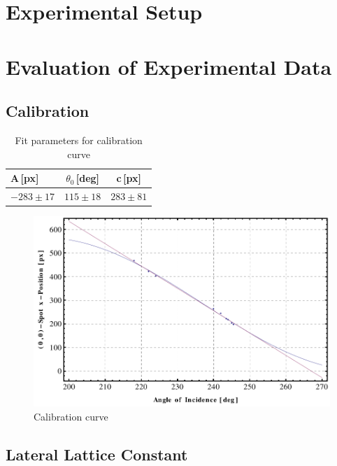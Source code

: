 \documentclass[a4paper,10pt]{scrartcl}
\begin{document}
\section{Experimental Setup}

\section{Evaluation of Experimental Data}

\subsection{Calibration}

\begin{table}
\begin{center}
\begin{tabular}{lcc}
\toprule
A\,[px] & $\theta_{0}$\,[deg] & c\,[px] \\
\midrule
$-283 \pm 17$ & $115 \pm 18$  & $283 \pm 81$ \\
\bottomrule
\end{tabular}
\end{center}
\par
\caption{Fit parameters for calibration curve \label{tab:calibdata}}
\end{table}

\begin{figure}
\centering
\includegraphics[scale=0.65]{img/calib}
\caption{Calibration curve \label{fig:calib}}
\end{figure}

\subsection{Lateral Lattice Constant}
\end{document}
